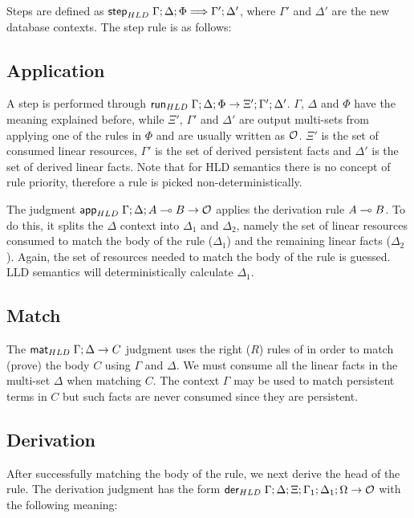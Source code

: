 Steps are defined as $\mathsf{step}_{HLD} \; \Gamma; \Delta; \Phi \Longrightarrow \Gamma';
\Delta'$, where $\Gamma'$ and $\Delta'$ are the new database contexts. The step
rule is as follows:



\subsection{Application}

A step is performed through $\mathsf{run}_{HLD} \; \Gamma; \Delta; \Phi \rightarrow \Xi';
\Gamma'; \Delta'$.  $\Gamma$, $\Delta$ and $\Phi$ have the meaning explained
before, while $\Xi'$, $\Gamma'$ and $\Delta'$ are output multi-sets from
applying one of the rules in $\Phi$ and are usually written as $\mathcal{O}$. $\Xi'$ is
the set of consumed linear resources, $\Gamma'$ is the set of derived persistent
facts and $\Delta'$ is the set of derived linear facts.  Note that for HLD
semantics there is no concept of rule priority, therefore a rule is picked
non-deterministically.

The judgment $\mathsf{app}_{HLD} \; \Gamma ; \Delta ; A \multimap B \rightarrow \mathcal{O}$
applies the derivation rule $A \multimap B$. To do this, it
splits the $\Delta$ context into $\Delta_1$ and $\Delta_2$, namely the set of
linear resources consumed to match the body of the rule ($\Delta_1$) and the
remaining linear facts ($\Delta_2$).  Again, the set of resources needed to
match the body of the rule is guessed. LLD semantics will deterministically
calculate $\Delta_1$.



\subsection{Match}

The $\mathsf{mat}_{HLD} \; \Gamma ; \Delta \rightarrow C$ judgment uses the right ($R$) rules of
\fragment in order to match (prove) the body $C$ using $\Gamma$
and $\Delta$. We must consume all the linear facts in the multi-set $\Delta$
when matching $C$. The context $\Gamma$ may be used to match persistent terms in
$C$ but such facts are never consumed since they are persistent.



\subsection{Derivation}

After successfully matching the body of the rule, we next derive the head of the
rule. The derivation judgment has the form $\mathsf{der}_{HLD} \; \Gamma ; \Delta ; \Xi ; \Gamma_1
; \Delta_1 ; \Omega \rightarrow \mathcal{O}$ with the following
meaning:

